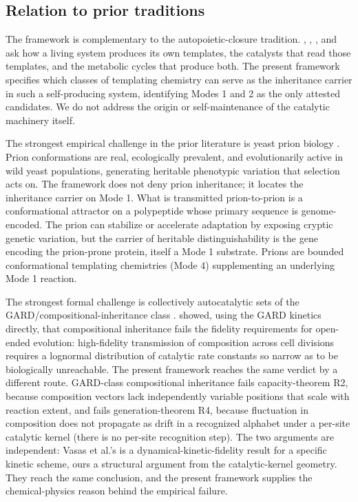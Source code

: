 \documentclass[aps,prx,reprint,amsmath,amssymb,floatfix,superscriptaddress,nofootinbib]{revtex4-2}
\theoremstyle{plain-thm}
\theoremstyle{definition-thm}
\begin{document}
\subsection{Relation to prior traditions}

The framework is complementary to the autopoietic-closure tradition. \citet{Rosen1958}, \citet{MaturanaVarela1972}, \citet{Pattee1972}, and \citet{Hofmeyr2017} ask how a living system produces its own templates, the catalysts that read those templates, and the metabolic cycles that produce both. The present framework specifies which classes of templating chemistry can serve as the inheritance carrier in such a self-producing system, identifying Modes 1 and 2 as the only attested candidates. We do not address the origin or self-maintenance of the catalytic machinery itself.

The strongest empirical challenge in the prior literature is yeast prion biology \citep{HalfmannLindquist2010, Halfmann2012}. Prion conformations are real, ecologically prevalent, and evolutionarily active in wild yeast populations, generating heritable phenotypic variation that selection acts on. The framework does not deny prion inheritance; it locates the inheritance carrier on Mode 1. What is transmitted prion-to-prion is a conformational attractor on a polypeptide whose primary sequence is genome-encoded. The prion can stabilize or accelerate adaptation by exposing cryptic genetic variation, but the carrier of heritable distinguishability is the gene encoding the prion-prone protein, itself a Mode 1 substrate. Prions are bounded conformational templating chemistries (Mode 4) supplementing an underlying Mode 1 reaction.

The strongest formal challenge is collectively autocatalytic sets of the GARD/compositional-inheritance class \citep{Kauffman1986, Hordijk2012}. \citet{Vasas2010} showed, using the GARD kinetics directly, that compositional inheritance fails the fidelity requirements for open-ended evolution: high-fidelity transmission of composition across cell divisions requires a lognormal distribution of catalytic rate constants so narrow as to be biologically unreachable. The present framework reaches the same verdict by a different route. GARD-class compositional inheritance fails capacity-theorem R2, because composition vectors lack independently variable positions that scale with reaction extent, and fails generation-theorem R4, because fluctuation in composition does not propagate as drift in a recognized alphabet under a per-site catalytic kernel (there is no per-site recognition step). The two arguments are independent: Vasas et al.'s is a dynamical-kinetic-fidelity result for a specific kinetic scheme, ours a structural argument from the catalytic-kernel geometry. They reach the same conclusion, and the present framework supplies the chemical-physics reason behind the empirical failure.
\end{document}
